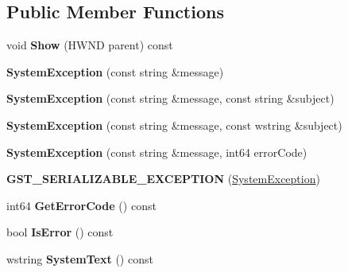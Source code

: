 \subsection*{Public Member Functions}
\begin{DoxyCompactItemize}
\item 
\mbox{\label{struct_gost_crypt_1_1_system_exception_a781e364a6ada1f415e801791ae228081}} 
void {\bfseries Show} (H\+W\+ND parent) const
\item 
\mbox{\label{struct_gost_crypt_1_1_system_exception_ae405c917fd1cab10688ae94347dc5a93}} 
{\bfseries System\+Exception} (const string \&message)
\item 
\mbox{\label{struct_gost_crypt_1_1_system_exception_a08a0905ff691c3ea0cb85593d45de3ca}} 
{\bfseries System\+Exception} (const string \&message, const string \&subject)
\item 
\mbox{\label{struct_gost_crypt_1_1_system_exception_a00c6f8354404202923061b6affdd4aa8}} 
{\bfseries System\+Exception} (const string \&message, const wstring \&subject)
\item 
\mbox{\label{struct_gost_crypt_1_1_system_exception_a925cc792522dd791657bee6da205749f}} 
{\bfseries System\+Exception} (const string \&message, int64 error\+Code)
\item 
\mbox{\label{struct_gost_crypt_1_1_system_exception_ad6271a2c36924f689da7499f7dba7901}} 
{\bfseries G\+S\+T\+\_\+\+S\+E\+R\+I\+A\+L\+I\+Z\+A\+B\+L\+E\+\_\+\+E\+X\+C\+E\+P\+T\+I\+ON} (\hyperlink{struct_gost_crypt_1_1_system_exception}{System\+Exception})
\item 
\mbox{\label{struct_gost_crypt_1_1_system_exception_a2370ebc1f29f1332f12ad1c00cdd4af3}} 
int64 {\bfseries Get\+Error\+Code} () const
\item 
\mbox{\label{struct_gost_crypt_1_1_system_exception_a5a7564eec1f43741545d19aec21040db}} 
bool {\bfseries Is\+Error} () const
\item 
\mbox{\label{struct_gost_crypt_1_1_system_exception_ab52e0356a83f73ca522e8369674806c3}} 
wstring {\bfseries System\+Text} () const
\end{DoxyCompactItemize}
